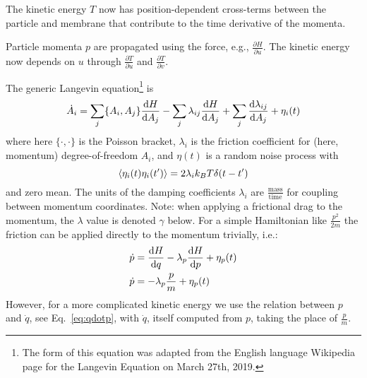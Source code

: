 The kinetic energy $T$ now has position-dependent cross-terms between the particle and membrane that contribute to the time derivative of the momenta.


Particle momenta $p$ are propagated using the force, e.g., $\frac{\partial{H}}{\partial{u}}$.
The kinetic energy now depends on $u$ through $\frac{\partial T}{\partial u}$ and $\frac{\partial T}{\partial v}$.






The generic Langevin equation\footnote{The form of this equation was adapted from the English language Wikipedia page for the Langevin Equation on March 27th, 2019.}
is
\begin{equation}
\dot{A}_i = \sum_j \{ A_i, A_j \} \frac{\textrm{d} H}{\textrm{d} A_j} - \sum_j \lambda_{ij} \frac{\textrm{d} H}{\textrm{d} A_j} + \sum_j \frac{ \textrm{d} \lambda_{ij} }{\textrm{d} A_j} + \eta_i(t)
\label{eq:biglangevin}
\end{equation}
where here $\{ \cdot, \cdot \}$ is the Poisson bracket, $\lambda_i$ is the friction coefficient for (here, momentum) degree-of-freedom $A_i$, and $\eta(t)$ is a random noise process with
\begin{equation}
\langle \eta_i(t) \eta_i(t') \rangle = 2 \lambda_i k_B T \delta(t-t')
\end{equation}
and zero mean.
The units of the damping coefficients $\lambda_i$ are $\frac{\textrm{mass}}{\textrm{time}}$ for coupling between momentum coordinates.
Note: when applying a frictional drag to the momentum, the $\lambda$ value is denoted $\gamma$ below.
For a simple Hamiltonian like $\frac{p^2}{2 m}$ the friction can be applied directly to the momentum trivially, i.e.:
\begin{align}
\dot{p} &= \frac{\textrm{d} H}{\textrm{d} q} - \lambda_p \frac{\textrm{d} H}{\textrm{d} p} + \eta_p(t) \\
\dot{p} &= - \lambda_p \frac{p}{m} + \eta_p(t) 
\end{align}
However, for a more complicated kinetic energy we use the relation between $p$ and $\dot{q}$, see Eq.~\ref{eq:qdotp}, with $\dot{q}$, itself computed from $p$, taking the place of $\frac{p}{m}$. 


%
%
%



